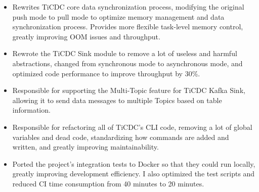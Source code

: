\documentclass{resume}
\newcommand{\en}[1]{#1}
\newcommand{\zh}[1]{}
\begin{document}
\begin{itemize}
      \item \en{Rewrites TiCDC core data synchronization process, modifying the original push mode to pull mode to optimize memory management and data synchronization process. Provides more flexible task-level memory control, greatly improving OOM issues and throughput.}
            \zh{重写 TiCDC 核心数据同步流程，将原来的推送模式修改为拉取模式优化了内存管理和数据同步流程。提供了更灵活的任务界别的内存控制，极大的改善了 OOM 问题和吞吐。}
      \item \en{Rewrote the TiCDC Sink module to remove a lot of useless and harmful abstractions, changed from synchronous mode to asynchronous mode, and optimized code performance to improve throughput by 30\%.}
            \zh{重写 TiCDC Sink 模块，删除了大量无用有害抽象，从同步模式修改为异步模式，优化代码性能，将吞吐提升 30\%。}
      \item \en{Responsible for supporting the Multi-Topic feature for TiCDC Kafka Sink, allowing it to send data messages to multiple Topics based on table information.}
            \zh{为 TiCDC Kafka Sink 支持了多 Topic 功能，让其可以根据表信息将数据消息发送至多个 Topics。}
      \item \en{Responsible for refactoring all of TiCDC's CLI code, removing a lot of global variables and dead code, standardizing how commands are added and written, and greatly improving maintainability.}
            \zh{负责重构了 TiCDC 的 CLI 所有代码，删除了大量全局变量和死代码，标准化命令添加和编写方式，极大提升了可维护性。}
      \item \en{Ported the project's integration tests to Docker so that they could run locally, greatly improving development efficiency. I also optimized the test scripts and reduced CI time consumption from 40 minutes to 20 minutes.}
            \zh{将该项目的集成测试移植到 Docker 中，使其能在本地运行，极大的提升了开发效率。同时优化了测试脚本，将 CI 时间消耗从 40 分钟降低至 20 分钟。}
\end{itemize}
\end{document}
